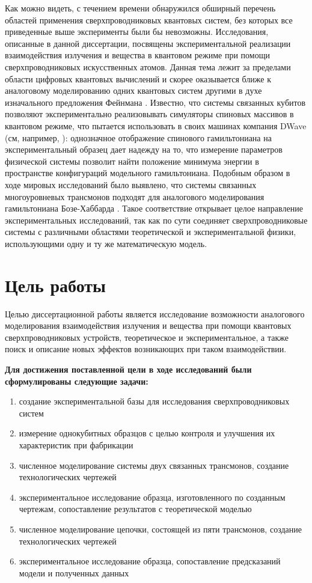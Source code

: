 \documentclass[14pt, a4paper]{extreport}
\numberwithin{equation}{section}
\begin{document}
Как можно видеть, с течением времени обнаружился обширный перечень областей применения сверхпроводниковых квантовых систем, без которых все приведенные выше эксперименты были бы невозможны. Исследования, описанные в данной диссертации, посвящены экспериментальной реализации взаимодействия излучения и вещества в квантовом режиме при помощи сверхпроводниковых искусственных атомов. Данная тема лежит за пределами области цифровых квантовых вычислений и скорее оказывается ближе к аналоговому моделированию одних квантовых систем другими в духе изначального предложения Фейнмана \cite{feynman1982simulating}. Известно, что системы связанных кубитов позволяют экспериментально реализовывать симуляторы спиновых массивов в квантовом режиме, что пытается использовать в своих машинах компания DWave (см, например, \cite{harris2018phase}): однозначное отображение спинового гамильтониана на экспериментальный образец дает надежду на то, что измерение параметров физической системы позволит найти положение минимума энергии в пространстве конфигураций модельного гамильтониана. Подобным образом в ходе мировых исследований было выявлено, что системы связанных многоуровневых трансмонов подходят для аналогового моделирования гамильтониана Бозе-Хаббарда \cite{Orell2019, Ma2019, Hacohen-Gourgy2015, Deng2016, Ye2019, Yan2019}. Такое соответствие открывает целое направление экспериментальных исследований, так как по сути соединяет сверхпроводниковые системы с различными областями теоретической и экспериментальной физики, использующими одну и ту же математическую модель.

\section*{Цель работы}

Целью диссертационной работы является исследование возможности аналогового моделирования взаимодействия излучения и вещества при помощи квантовых сверхпроводниковых устройств, теоретическое и экспериментальное, а также поиск и описание новых эффектов возникающих при таком взаимодействии.

\textbf{Для достижения поставленной цели в ходе исследований были сформулированы следующие задачи:}

\begin{enumerate}
	\item создание экспериментальной базы для исследования сверхпроводниковых систем
	\item измерение однокубитных образцов с целью контроля и улучшения их характеристик при фабрикации
	\item численное моделирование системы двух связанных трансмонов, создание технологических чертежей
	\item экспериментальное исследование образца, изготовленного по созданным чертежам, сопоставление результатов с теоретической моделью
	\item численное моделирование цепочки, состоящей из пяти трансмонов, создание технологических чертежей
	\item экспериментальное исследование образца, сопоставление предсказаний модели и полученных данных
\end{enumerate}
\end{document}
